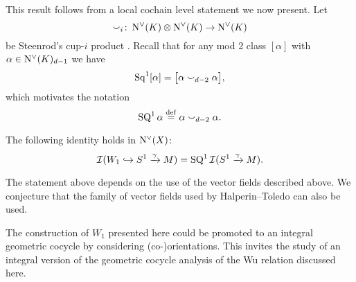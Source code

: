 This result follows from a local cochain level statement we now present.
Let
\[
\smallsmile_i \colon \operatorname{N^{\vee}}(K) \otimes \operatorname{N^{\vee}}(K) \to \operatorname{N^{\vee}}(K)
\]
be Steenrod's cup-$i$ product \cite{steenrod1947products, medina2022axiomatic}.
Recall that for any mod 2 class $[\alpha]$ with $\alpha \in \operatorname{N^{\vee}}(K)_{d-1}$ we have
\[
\operatorname{Sq}^1 [\alpha] = \big[ \alpha \smallsmile_{d-2} \alpha \big],
\]
which motivates the notation
\[
\operatorname{SQ}^1 \alpha \stackrel{\mathrm{def}}{=} \alpha \smallsmile_{d-2} \alpha.
\]
\begin{proposition}
	The following identity holds in $\operatorname{N^{\vee}}(X)$:
	\[
	\mathcal{I}(W_1 \hookrightarrow S^1 \xrightarrow{\gamma} M) = \operatorname{SQ}^1 \mathcal{I}(S^1 \xrightarrow{\gamma} M).
	\]
\end{proposition}

The statement above depends on the use of the vector fields described above.
We conjecture that the family of vector fields used by Halperin--Toledo \cite{halperin1972stiefel} can also be used.

\begin{remark*}
	The construction of $W_1$ presented here could be promoted to an integral geometric cocycle by considering (co-)orientations.
	This invites the study of an integral version of the geometric cocycle analysis of the Wu relation discussed here.
\end{remark*}
